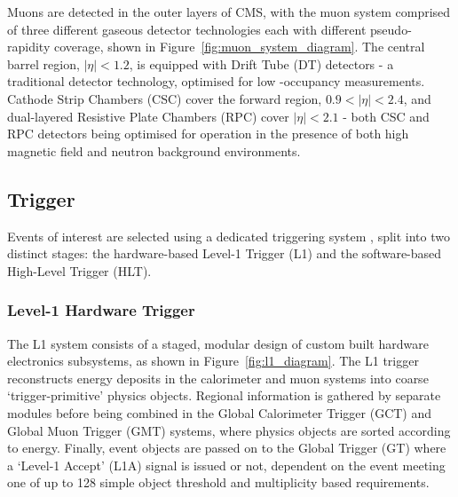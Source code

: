 Muons are detected in the outer layers of CMS, with the muon system 
comprised of three different gaseous detector technologies each with different 
pseudo-rapidity coverage, shown in Figure~\ref{fig:muon_system_diagram}. The
central barrel region, $|\eta|<1.2$, is equipped with 
Drift Tube (DT) detectors - a traditional detector technology, optimised for low
-occupancy measurements. Cathode Strip Chambers (CSC) cover the forward region,
$0.9 < |\eta| < 2.4$, and dual-layered Resistive Plate Chambers (RPC) cover
$|\eta| < 2.1$ - both CSC and RPC detectors being optimised for operation in 
the presence of both high magnetic field and neutron background environments.


\subsection{Trigger}
\label{sec:detector_trigger}
Events of interest are selected using a dedicated triggering system \cite{tridasTDR},
split into two distinct stages: the hardware-based Level-1 Trigger (L1) and
the software-based High-Level Trigger (HLT).

\subsubsection{Level-1 Hardware Trigger}

The L1 system consists of a staged, modular design of custom built hardware 
electronics subsystems, as shown in Figure~\ref{fig:l1_diagram}. 
The L1 trigger reconstructs energy deposits in the calorimeter and muon systems
into coarse `trigger-primitive' physics objects.
Regional information is gathered by separate modules 
before being combined in the Global Calorimeter Trigger (GCT) and Global Muon 
Trigger (GMT) systems, where physics objects are sorted according to energy. 
Finally, event objects are passed on to the Global Trigger (GT) where a 
`Level-1 Accept' (L1A) signal is issued or not, dependent on the event meeting 
one of up to 128 simple object threshold and multiplicity based requirements.

